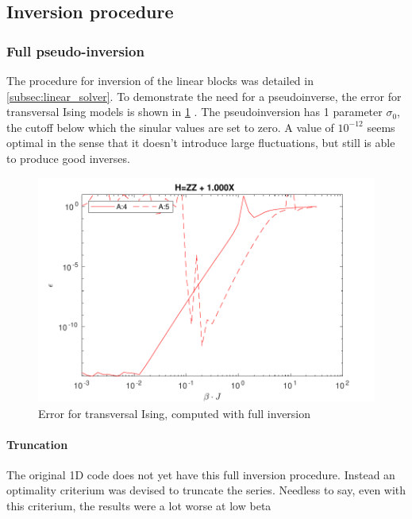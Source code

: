 \subsection{Inversion procedure}\label{subsec:inversion_procedure}

\subsubsection{Full pseudo-inversion}

The procedure for inversion of the linear blocks was detailed in \cref{subsec:linear_solver}. To demonstrate the need for a pseudoinverse, the error for transversal Ising models is shown in \cref{benc:fig:fullinv} . The pseudoinversion has 1 parameter $\sigma_0$, the cutoff below which the sinular values are set to zero. A value of $10^{-12}$ seems optimal in the sense that it doesn't introduce large fluctuations, but still is able to produce good inverses.

\begin{figure}
    \center
    \includegraphics[width=\textwidth]{Figuren/benchmarking/t_ising_full_inverse.pdf }
    \caption{Error for transversal Ising, computed with full inversion }
    \label{benc:fig:fullinv}
\end{figure}

\paragraph{Truncation}

The original 1D code does not yet have this full inversion procedure. Instead an optimality criterium was devised to truncate the series. Needless to say, even with this criterium, the results were a lot worse at low beta


